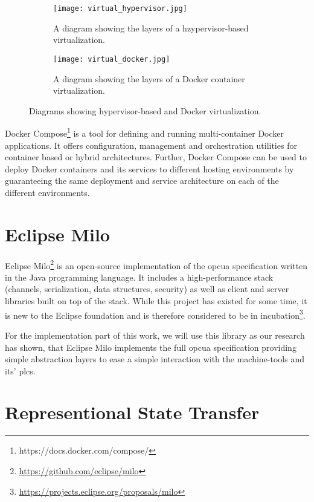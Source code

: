 \documentclass[
a4paper,
twoside,
headsepline,
cleardoublepage=empty,
parskip=half,
draft=false
]{scrbook}
\begin{document}
			\begin{figure}[htbp]
				\centering
				\begin{subfigure}{0.45\textwidth}
					\centering
					\texttt{[image: virtual\_hypervisor.jpg]}
					\caption{A diagram showing the layers of a hzypervisor-based virtualization.}
					\label{fig:hypervisor}
				\end{subfigure}
				\hfill
				\begin{subfigure}{0.45\textwidth}
					\centering
					\texttt{[image: virtual\_docker.jpg]}
					\caption{A diagram showing the layers of a Docker container virtualization.}
					\label{fig:docker}
				\end{subfigure}
				\caption{Diagrams showing hypervisor-based and Docker virtualization.}
				\label{fig:virtualization}
			\end{figure}
			
			Docker Compose\footnote{https://docs.docker.com/compose/} is a tool for defining and running multi-container Docker applications. It offers configuration, management and orchestration utilities for container based or hybrid architectures. Further, Docker Compose can be used to deploy Docker containers and its services to different hosting environments by guaranteeing the same deployment and service architecture on each of the different environments.

		\section{Eclipse Milo}\label{sec:eclipse_milo}

			Eclipse Milo\footnote{\url{https://github.com/eclipse/milo}} is an open-source implementation of the \gls{opcua} specification written in the Java programming language. 
			It includes a high-performance stack (channels, serialization, data structures, security) as well as client and server libraries built on top of the stack.
			While this project has existed for some time, it is new to the Eclipse foundation and is therefore considered to be in incubation\footnote{\url{https://projects.eclipse.org/proposals/milo}}.
			
			For the implementation part of this work, we will use this library as our research has shown, that Eclipse Milo implements the full \gls{opcua} specification providing simple abstraction layers to ease a simple interaction with the machine-tools and its' \gls{plc}s.

		\section{Representional State Transfer}\label{sec:rest}
\end{document}
